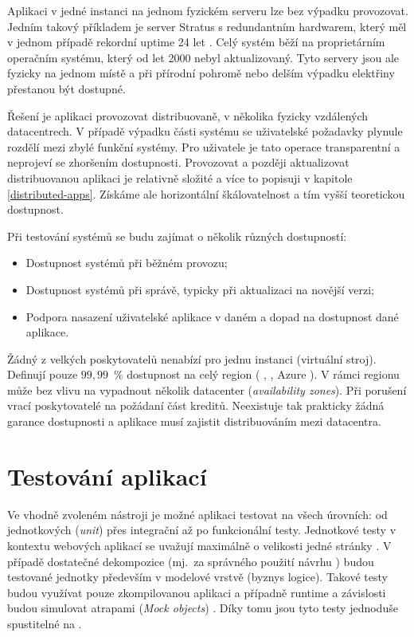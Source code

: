         Aplikaci v jedné instanci na jednom fyzickém serveru lze bez výpadku provozovat. Jedním takový příkladem je server Stratus s redundantním hardwarem, který měl v jednom případě rekordní uptime 24 let \cite{thibodeau-longest-uptime}. Celý systém běží na proprietárním operačním systému, který od let 2000 nebyl aktualizovaný. Tyto servery jsou ale fyzicky na jednom místě a při přírodní pohromě nebo delším výpadku elektřiny přestanou být dostupné.

        Řešení je aplikaci provozovat distribuovaně, v několika fyzicky vzdálených datacentrech. V případě výpadku části systému se uživatelské požadavky plynule rozdělí mezi zbylé funkční systémy. Pro uživatele je tato operace transparentní a neprojeví se zhoršením dostupnosti. Provozovat a později aktualizovat distribuovanou aplikaci je relativně složité a více to popisuji v kapitole \ref{distributed-apps}. Získáme ale horizontální škálovatelnost a tím vyšší teoretickou dostupnost.

        Při testování \CICD systémů se budu zajímat o několik různých dostupností:
        \begin{itemize}
            \item Dostupnost \CICD systémů při běžném provozu;
            \item Dostupnost \CICD systémů při správě, typicky při aktualizaci na novější verzi;
            \item Podpora nasazení uživatelské aplikace v daném \CICD a dopad na dostupnost dané aplikace.
        \end{itemize}

        Žádný z velkých poskytovatelů nenabízí  pro jednu instanci (virtuální stroj). Definují pouze $99,99$~\% dostupnost na celý region ( \cite{aws-sla},  \cite{gcp-sla}, Azure \cite{azure-sla}). V rámci regionu může bez vlivu na  vypadnout několik datacenter (\textit{availability zones}). Při porušení  vrací poskytovatelé na požádaní část kreditů. Neexistuje tak prakticky žádná garance dostupnosti a aplikace musí  zajistit distribuováním mezi datacentra.

    \section*{Testování aplikací}
        Ve vhodně zvoleném \CI nástroji je možné aplikaci testovat na všech úrovních: od jednotkových (\textit{unit}) přes integrační až po funkcionální testy. Jednotkové testy v kontextu webových aplikací se uvažují maximálně o velikosti jedné stránky \cite{testing-web-apps}. V případě dostatečné dekompozice (mj.~za správného použití návrhu ) budou testované jednotky především v modelové vrstvě (byznys logice). Takové testy budou využívat pouze zkompilovanou aplikaci a případně runtime a závislosti budou simulovat atrapami (\textit{Mock objects}) \cite{mocks}. Díky tomu jsou tyto testy jednoduše spustitelné na \CI.

